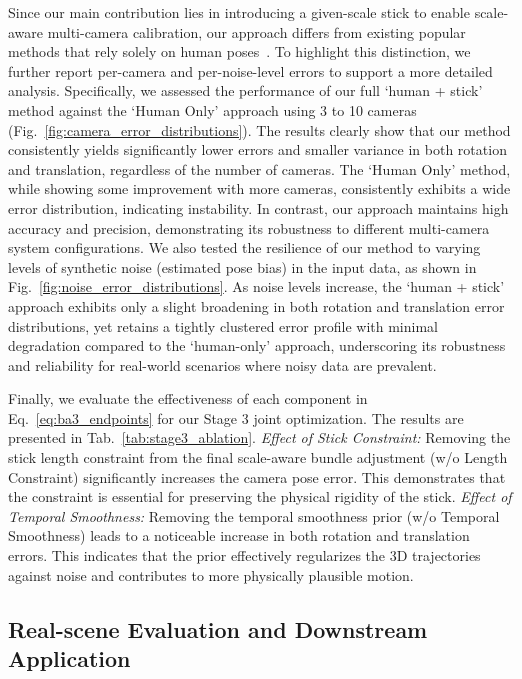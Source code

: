 \documentclass[a4paper, 10pt, conference]{ieeeconf}      %
\begin{document}
Since our main contribution lies in introducing a given-scale stick to enable scale-aware multi-camera calibration, our approach differs from existing popular methods that rely solely on human poses~\cite{garau2020fast,lee2025spatiotemporal,lee2022extrinsic,patzold2022online,xu2021wide}. To highlight this distinction, we further report per-camera and per-noise-level errors to support a more detailed analysis. Specifically, we assessed the performance of our full `human + stick' method against the `Human Only' approach using 3 to 10 cameras (Fig.~\ref{fig:camera_error_distributions}). The results clearly show that our method consistently yields significantly lower errors and smaller variance in both rotation and translation, regardless of the number of cameras. The `Human Only' method, while showing some improvement with more cameras, consistently exhibits a wide error distribution, indicating instability. In contrast, our approach maintains high accuracy and precision, demonstrating its robustness to different multi-camera system configurations. We also tested the resilience of our method to varying levels of synthetic noise (estimated pose bias) in the input data, as shown in Fig.~\ref{fig:noise_error_distributions}. As noise levels increase, the `human + stick' approach exhibits only a slight broadening in both rotation and translation error distributions, yet retains a tightly clustered error profile with minimal degradation compared to the `human-only' approach, underscoring its robustness and reliability for real-world scenarios where noisy data are prevalent.



Finally, we evaluate the effectiveness of each component in Eq.~\eqref{eq:ba3_endpoints} for our Stage 3 joint optimization. The results are presented in Tab.~\ref{tab:stage3_ablation}. \textit{Effect of Stick Constraint:} Removing the stick length constraint from the final scale-aware bundle adjustment (w/o Length Constraint) significantly increases the camera pose error. This demonstrates that the constraint is essential for preserving the physical rigidity of the stick. \textit{Effect of Temporal Smoothness:} Removing the temporal smoothness prior (w/o Temporal Smoothness) leads to a noticeable increase in both rotation and translation errors. This indicates that the prior effectively regularizes the 3D trajectories against noise and contributes to more physically plausible motion.


\subsection{Real-scene Evaluation and Downstream Application}
\end{document}
